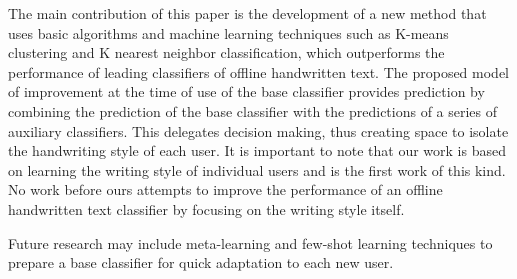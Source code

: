 \documentclass{article}
\begin{document}
The main contribution of this paper is the development of a new method that uses basic algorithms and machine learning techniques such as K-means clustering
and K nearest neighbor classification, which outperforms the performance of leading classifiers of offline handwritten text.
The proposed model of improvement at the time of use of the base classifier provides prediction by combining the prediction of the base classifier
with the predictions of a series of auxiliary classifiers.
This delegates decision making, thus creating space to isolate the handwriting style of each user.
It is important to note that our work is based on learning the writing style of individual users and is the first work of this kind.
No work before ours attempts to improve the performance of an offline handwritten text classifier by focusing on the writing style itself.

Future research may include meta-learning and few-shot learning techniques to prepare a base classifier for quick adaptation to each new user.

\small
\end{document}

